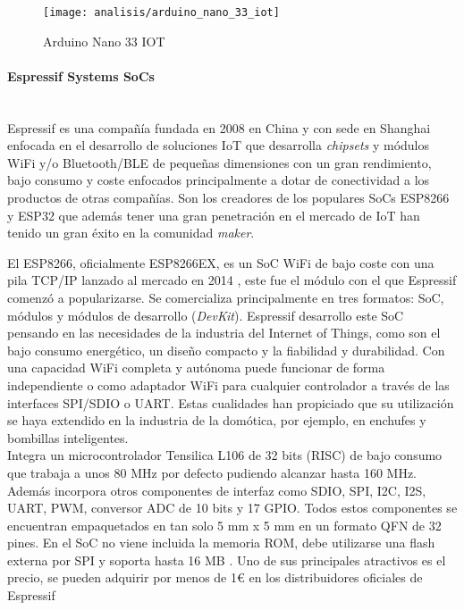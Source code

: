 \documentclass[../proyecto.tex]{subfiles}
\begin{document}
\begin{figure}[H]
\centering
\texttt{[image: analisis/arduino\_nano\_33\_iot]}
\caption{Arduino Nano 33 IOT}
\label{fig:arduino_nano_33_iot}
\end{figure}

\paragraph{Espressif Systems SoCs}\mbox{}\\

Espressif es una compañía fundada en 2008 en China y con sede en Shanghai enfocada en el desarrollo de soluciones IoT que desarrolla \textit{chipsets} y módulos WiFi y/o Bluetooth/BLE de pequeñas dimensiones con un gran rendimiento, bajo consumo y coste enfocados principalmente a dotar de conectividad a los productos de otras compañías. Son los creadores de los populares SoCs ESP8266 y ESP32 que además tener una gran penetración en el mercado de IoT han tenido un gran éxito en la comunidad \textit{maker}.\\


El ESP8266, oficialmente ESP8266EX, es un SoC WiFi de bajo coste con una pila TCP/IP lanzado al mercado en 2014 \cite{esp8266_overview}, este fue el módulo con el que Espressif comenzó a popularizarse. Se comercializa principalmente en tres formatos: SoC, módulos y módulos de desarrollo (\textit{DevKit}). Espressif desarrollo este SoC pensando en las necesidades de la industria del Internet of Things, como son el bajo consumo energético, un diseño compacto y la fiabilidad y durabilidad. Con una capacidad WiFi completa y autónoma puede funcionar de forma independiente o como adaptador WiFi para cualquier controlador a través de las interfaces SPI/SDIO o UART. Estas cualidades han propiciado que su utilización se haya extendido en la industria de la domótica, por ejemplo, en enchufes y bombillas inteligentes. \\

Integra un microcontrolador Tensilica L106 de 32 bits (RISC) de bajo consumo que trabaja a unos 80 MHz por defecto pudiendo alcanzar hasta 160 MHz. Además incorpora otros componentes de interfaz como SDIO, SPI, I2C, I2S, UART, PWM, conversor ADC de 10 bits y 17 GPIO. Todos estos componentes se encuentran empaquetados en tan solo 5 mm x 5 mm en un formato QFN de 32 pines. En el SoC no viene incluida la memoria ROM, debe utilizarse una flash externa por SPI y soporta hasta 16 MB \cite{esp8266_datasheet}. Uno de sus principales atractivos es el precio, se pueden adquirir por menos de 1€ en los distribuidores oficiales de Espressif \cite{espressif_provider_digikey} \cite{espressif_provider_mouser}\\
\end{document}
